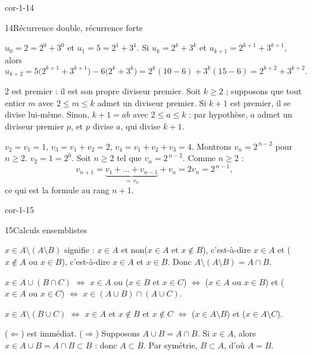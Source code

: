 \begin{blocLivre}{cor-1-14}
\begin{corrige}{14}{Récurrence double, récurrence forte}
\begin{questions}
  \item {} $u_0=2=2^{0}+3^{0}$ et $u_1=5=2^{1}+3^{1}$.
     Si $u_k=2^{k}+3^{k}$ et $u_{k+1}=2^{k+1}+3^{k+1}$, alors
    \[u_{k+2}=5\bigl(2^{k+1}+3^{k+1}\bigr)-6\bigl(2^{k}+3^{k}\bigr)
      =2^{k}(10-6)+3^{k}(15-6)=2^{k+2}+3^{k+2}.\]
  \item {} $2$ est premier : il est son propre diviseur premier.
     Soit $k\geq2$ ; supposons que tout entier $m$ avec $2\leq m\leq k$ admet un
    diviseur premier. Si $k+1$ est premier, il se divise lui-même. Sinon, $k+1=ab$ avec
    $2\leq a\leq k$ : par hypothèse, $a$ admet un diviseur premier $p$, et $p$ divise $a$, qui divise $k+1$.
  \item $v_2=v_1=1$, $v_3=v_1+v_2=2$, $v_4=v_1+v_2+v_3=4$. Montrons $v_n=2^{\,n-2}$ pour $n\geq2$.
     $v_2=1=2^{0}$.
     Soit $n\geq2$ tel que $v_n=2^{\,n-2}$. Comme $n\geq2$ :
    \[v_{n+1}=\underbrace{v_1+\dots+v_{n-1}}_{=\,v_n}+v_n=2v_n=2^{\,n-1},\]
    ce qui est la formule au rang $n+1$.
\end{questions}
\end{corrige}
\end{blocLivre}

\begin{blocLivre}{cor-1-15}
\begin{corrige}{15}{Calculs ensemblistes}
\begin{questions}
  \item $x\in A\setminus(A\setminus B)$ signifie : $x\in A$ et non($x\in A$ et $x\notin B$),
    c'est-à-dire $x\in A$ et ($x\notin A$ ou $x\in B$), c'est-à-dire $x\in A$ et $x\in B$.
    Donc $A\setminus(A\setminus B)=A\cap B$.
  \item $x\in A\cup(B\cap C)$ $\iff$ $x\in A$ ou ($x\in B$ et $x\in C$) $\iff$
    ($x\in A$ ou $x\in B$) et ($x\in A$ ou $x\in C$) $\iff$ $x\in(A\cup B)\cap(A\cup C)$.
  \item $x\in A\setminus(B\cup C)$ $\iff$ $x\in A$ et $x\notin B$ et $x\notin C$ $\iff$
    ($x\in A\setminus B$) et ($x\in A\setminus C$).
  \item ($\Leftarrow$) est immédiat. ($\Rightarrow$) Supposons $A\cup B=A\cap B$. Si $x\in A$, alors
    $x\in A\cup B=A\cap B\subset B$ : donc $A\subset B$. Par symétrie, $B\subset A$, d'où $A=B$.
\end{questions}
\end{corrige}
\end{blocLivre}

